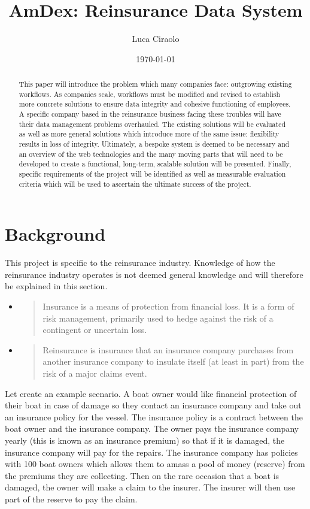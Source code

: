 \documentclass[12pt]{article}
\title{AmDex: Reinsurance Data System}
\author{Luca Ciraolo}
\date{\today}
\begin{document}
\maketitle
\begin{abstract}
    This paper will introduce the problem which many companies face: outgrowing existing workflows. As companies scale, workflows must be modified and revised to establish more concrete solutions to ensure data integrity and cohesive functioning of employees. A specific company based in the reinsurance business facing these troubles will have their data management problems overhauled. The existing solutions will be evaluated as well as more general solutions which introduce more of the same issue: flexibility results in loss of integrity. Ultimately, a bespoke system is deemed to be necessary and an overview of the web technologies and the many moving parts that will need to be developed to create a functional, long-term, scalable solution will be presented. Finally, specific requirements of the project will be identified as well as measurable evaluation criteria which will be used to ascertain the ultimate success of the project.
\end{abstract}

\section{Background}
This project is specific to the reinsurance industry. Knowledge of how the reinsurance industry operates is not deemed general knowledge and will therefore be explained in this section.

\begin{itemize}
    \item \blockquote[\cite{wikipedia_insurance}]{Insurance is a means of protection from financial loss. It is a form of risk management, primarily used to hedge against the risk of a contingent or uncertain loss.}
    \item \blockquote[\cite{wikipedia_reinsurance}]{Reinsurance is insurance that an insurance company purchases from another insurance company to insulate itself (at least in part) from the risk of a major claims event.}
\end{itemize}

Let create an example scenario. A boat owner would like financial protection of their boat in case of damage so they contact an insurance company and take out an insurance policy for the vessel. The insurance policy is a contract between the boat owner and the insurance company. The owner pays the insurance company yearly (this is known as an insurance premium) so that if it is damaged, the insurance company will pay for the repairs. The insurance company has policies with 100 boat owners which allows them to amass a pool of money (reserve) from the premiums they are collecting. Then on the rare occasion that a boat is damaged, the owner will make a claim to the insurer. The insurer will then use part of the reserve to pay the claim.
\end{document}
